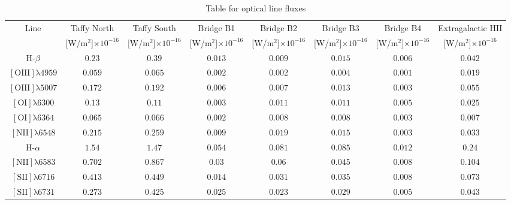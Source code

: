 \documentclass[9pt]{article}
\begin{document}
\begin{landscape}
\begin{table}
\begin{center}
\begin{tabular}{c | c | c | c | c | c | c | c}

Line & Taffy North & Taffy South & Bridge B1 & Bridge B2 & Bridge B3 & Bridge B4  & Extragalactic HII \\
        & [W/m$^2$]$\times10^{-16}$ & [W/m$^2$]$\times10^{-16}$ & [W/m$^2$]$\times10^{-16}$ & [W/m$^2$]$\times10^{-16}$ & [W/m$^2$]$\times10^{-16}$ & [W/m$^2$]$\times10^{-16}$ & [W/m$^2$]$\times10^{-16}$ \\

H-$\beta$					& $0.23$  & $0.39$ 	 & $0.013$ & $0.009$ & $0.015$ & $0.006$ & $0.042$ \\
$\mathrm{[OIII]\lambda4959}$	& $0.059$ & $0.065$ & $0.002$ & $0.002$ & $0.004$ & $0.001$  & $0.019$ \\
$\mathrm{[OIII]\lambda5007}$	& $0.172$ & $0.192$ & $0.006$ & $0.007$ & $0.013$ & $0.003$ & $0.055$ \\
$\mathrm{[OI]\lambda6300}$	& $0.13$ 	& $0.11$	& $0.003$ & $0.011$ & $0.011$ & $0.005$ & $0.025$ \\
$\mathrm{[OI]\lambda6364}$	& $0.065$ & $0.066$& $0.002$ & $0.008$ & $0.008$ & $0.003$ & $0.007$ \\
$\mathrm{[NII]\lambda6548}$	& $0.215$ & $0.259$& $0.009$ & $0.019$ & $0.015$ & $0.003$ & $0.033$ \\
H-$\alpha$ 				& $1.54$ 	& $1.47$	& $0.054$ & $0.081$ & $0.085$ & $0.012$ & $0.24$ \\
$\mathrm{[NII]\lambda6583}$	& $0.702$ & $0.867$& $0.03$ & $0.06$ & $0.045$ & $0.008$ & $0.104$ \\
$\mathrm{[SII]\lambda6716}$	& $0.413$ & $0.449$& $0.014$ & $0.031$ & $0.035$ & $0.008$ & $0.073$ \\
$\mathrm{[SII]\lambda6731}$	& $0.273$ & $0.425$& $0.025$ & $0.023$ & $0.029$ & $0.005$ & $0.043$ \\

\end{tabular}
\caption{Table for optical line fluxes}
\end{center}
\end{table}

\begin{table}
\begin{center}
\begin{tabular}{c | c | c | c | c | c | c | c}


\end{tabular}
\end{center}
\end{table}
\end{landscape}
\end{document}
